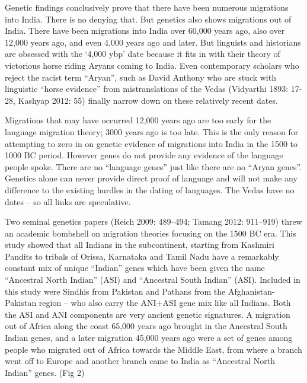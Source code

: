Genetic findings conclusively prove that there have been numerous migrations into India. There is no denying that. But genetics also shows migrations out of India. There have been migrations into India over 60,000 years ago, also over 12,000 years ago, and even 4,000 years ago and later. But linguists and historians are obsessed with the ‘4,000 ybp’ date because it fits in with their theory of victorious horse riding Aryans coming to India. Even contemporary scholars who reject the racist term “Aryan”, such as David Anthony who are stuck with linguistic “horse evidence” from mistranslations of the Vedas (Vidyarthi 1893: 17-28, Kashyap 2012: 55) finally narrow down on these relatively recent dates.

Migrations that may have occurred 12,000 years ago are too early for the language migration theory; 3000 years ago is too late. This is the only reason for attempting to zero in on genetic evidence of migrations into India in the 1500 to 1000 BC period. However genes do not provide any evidence of the language people spoke. There are no “language genes” just like there are no “Aryan genes”. Genetics alone can never provide direct proof of language and will not make any difference to the existing hurdles in the dating of languages. The Vedas have no dates – so all links are speculative.

Two seminal genetics papers (Reich 2009: 489–494; Tamang 2012: 911–919) threw an academic bombshell on migration theories focusing on the 1500 BC era. This study showed that all Indians in the subcontinent, starting from Kashmiri Pandits to tribals of Orissa, Karnataka and Tamil Nadu have a remarkably constant mix of unique “Indian” genes which have been given the name “Ancestral North Indian” (ASI) and “Ancestral South Indian” (ASI). Included in this study were Sindhis from Pakistan and Pathans from the Afghanistan-Pakistan region – who also carry the ANI+ASI gene mix like all Indians. Both the ASI and ANI components are very ancient genetic signatures. A migration out of Africa along the coast 65,000 years ago brought in the Ancestral South Indian genes, and a later migration 45,000 years ago were a set of genes among people who migrated out of Africa towards the Middle East, from where a branch went off to Europe and another branch came to India as “Ancestral North Indian” genes. (Fig 2)

